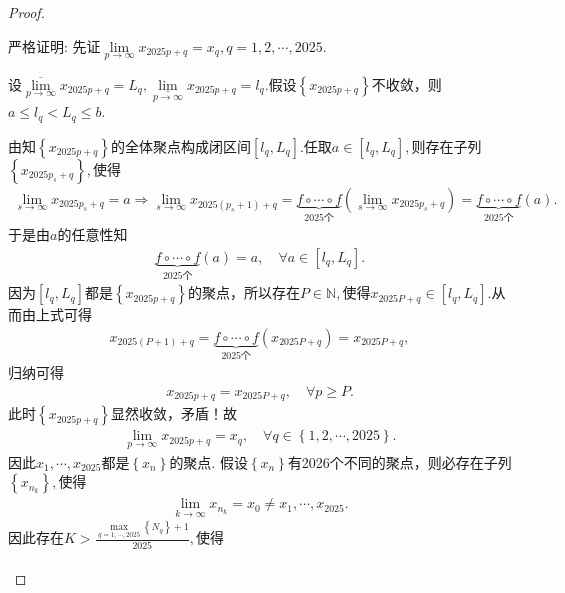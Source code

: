 \documentclass[../../main.tex]{subfiles}%
\begin{document}
\begin{proof}
\begin{enumerate}
{\color{blue}严格证明:}
先证$\underset{p\rightarrow \infty}{\lim}x_{2025p+q}=x_q,q=1,2,\cdots ,2025.$

设$\underset{p\rightarrow \infty}{\overline{\lim }}x_{2025p+q}=L_q,\underset{p\rightarrow \infty}{\underline{\lim }}x_{2025p+q}=l_q.$假设$\left\{ x_{2025p+q} \right\}$不收敛，则$a\leqslant l_q<L_q\leqslant b.$

由知$\left\{ x_{2025p+q} \right\}$的全体聚点构成闭区间$\left[ l_q,L_q \right].$任取$a\in \left[ l_q,L_q \right],$则存在子列$\left\{ x_{2025p_s+q} \right\},$使得
\begin{align*}
\underset{s\rightarrow \infty}{\lim}x_{2025p_s+q}=a\Longrightarrow \underset{s\rightarrow \infty}{\lim}x_{2025\left( p_s+1 \right) +q}=\underset{2025\text{个}}{\underbrace{f\circ  \cdots \circ  f}}\left( \underset{s\rightarrow \infty}{\lim}x_{2025p_s+q} \right) =\underset{2025\text{个}}{\underbrace{f\circ  \cdots \circ  f}}\left( a \right).
\end{align*}
于是由$a$的任意性知
\begin{align*}
\underset{2025\text{个}}{\underbrace{f\circ  \cdots \circ  f}}\left( a \right) =a,\quad \forall a\in \left[ l_q,L_q \right].
\end{align*}
因为$\left[ l_q,L_q \right]$都是$\left\{ x_{2025p+q} \right\}$的聚点，所以存在$P\in \mathbb{N},$使得$x_{2025P+q}\in \left[ l_q,L_q \right].$从而由上式可得
\begin{align*}
x_{2025\left( P+1 \right) +q}=\underset{2025\text{个}}{\underbrace{f\circ  \cdots \circ  f}}\left( x_{2025P+q} \right) =x_{2025P+q},
\end{align*}
归纳可得
\begin{align*}
x_{2025p+q}=x_{2025P+q},\quad \forall p\geqslant P.
\end{align*}
此时$\left\{ x_{2025p+q} \right\}$显然收敛，矛盾！故
\begin{align}\label{eq::390423t345e4g}
\underset{p\rightarrow \infty}{\lim}x_{2025p+q}=x_q,\quad \forall q\in \left\{ 1,2,\cdots ,2025 \right\}.
\end{align}
因此$x_1,\cdots ,x_{2025}$都是$\left\{ x_n \right\}$的聚点.
假设$\left\{ x_n \right\}$有2026个不同的聚点，则必存在子列$\left\{ x_{n_k} \right\},$使得
\begin{align*}
\underset{k\rightarrow \infty}{\lim}x_{n_k}=x_0\ne x_1,\cdots ,x_{2025}.
\end{align*}
因此存在$K>\frac{\underset{q=1,\cdots ,2025}{\max}\left\{ N_q \right\} +1}{2025},$使得
\begin{align}

\end{align}
\end{enumerate}
\end{proof}
\end{document}
